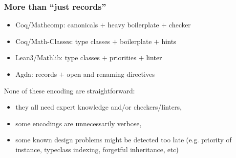 \documentclass[11pt]{beamer}
\begin{document}
\begin{frame}
  \frametitle{More than ``just records''}



  \begin{itemize}
  \item {\sc Coq/Mathcomp}:     canonicals \alert<1>{$+$ heavy boilerplate $+$ checker}
  \item {\sc Coq/Math-Classes}: type classes \alert<1>{$+$ boilerplate $+$ hints}
  \item {\sc Lean3/Mathlib}:     type classes \alert<1>{$+$ priorities $+$ linter}
  \item {\sc Agda}:             records \alert<1>{$+$ open and renaming directives}
  \end{itemize}

  \vfill
  \pause
  \vfill

  None of these encoding are straightforward:
  \begin{itemize}
  \item they all need expert knowledge and/or checkers/linters,
  \item some encodings are unnecessarily verbose,
  \item some known design problems might be detected too late
    (e.g. priority of instance, typeclass indexing, forgetful
    inheritance, etc)
  \end{itemize}


  \vfill
  \pause
\end{frame}
\end{document}

